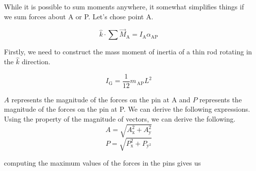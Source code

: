 \documentclass[nofoot,pdf-a,balance,colorlinks,upint,subscriptcorrection,varvw,mathalfa=cal=boondoxo]{asmeconf}
\begin{document}
    

    While it is possible to sum moments anywhere, it somewhat simplifies things if we sum forces about A or P. Let's chose point A.

    \begin{equation}
        \hat{k}\cdot\sum{\vec{M}_{\textrm{A}}} = I_{\textrm{A}}\alpha_{\textrm{AP}}
    \end{equation}

    Firstly, we need to construct the mass moment of inertia of a thin rod rotating in the $\hat{k}$ direction.


    \begin{equation} 
        I_{\textrm{G}} = \frac{1}{12}m_{\,\textrm{AP}}L^2
    \end{equation}



    $A$ represents the magnitude of the forces on the pin at A and $P$ represents the magnitude of the forces on the pin at P. We can derive the following expressions. Using the property of the magnitude of vectors, we can derive the following.
    \begin{equation}
        A = \sqrt{A_{\textrm{x}}^2 + A_{\textrm{y}}^2}
    \end{equation}
    \begin{equation}
        P = \sqrt{P_{\textrm{x}}^2 + P_{\textrm{y}^2}}
    \end{equation}

computing the maximum values of the forces in the pins gives us
\begin{table}[H]
        \caption[Table]{Max forces at A}\label{tab:aForce}
    \end{table}
\end{document}
